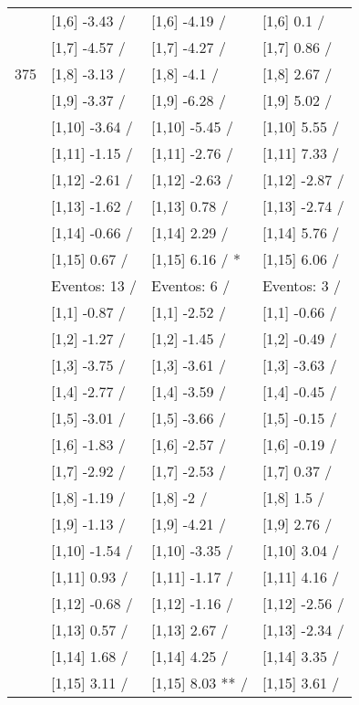 \begin{table}
\begin{tabular}[t]{llll}
 & {}[1,6] -3.43  / & {}[1,6] -4.19  / & {}[1,6] 0.1  /\\
 & {}[1,7] -4.57  / & {}[1,7] -4.27  / & {}[1,7] 0.86  /\\
375 & {}[1,8] -3.13  / & {}[1,8] -4.1  / & {}[1,8] 2.67  /\\
\addlinespace
 & {}[1,9] -3.37  / & {}[1,9] -6.28  / & {}[1,9] 5.02  /\\
 & {}[1,10] -3.64  / & {}[1,10] -5.45  / & {}[1,10] 5.55  /\\
 & {}[1,11] -1.15  / & {}[1,11] -2.76  / & {}[1,11] 7.33  /\\
 & {}[1,12] -2.61  / & {}[1,12] -2.63  / & {}[1,12] -2.87  /\\
 & {}[1,13] -1.62  / & {}[1,13] 0.78  / & {}[1,13] -2.74  /\\
\addlinespace
 & {}[1,14] -0.66  / & {}[1,14] 2.29  / & {}[1,14] 5.76  /\\
 & {}[1,15] 0.67  / & {}[1,15] 6.16  / * & {}[1,15] 6.06  /\\
 & Eventos:  13 / & Eventos:  6 / & Eventos:  3 /\\
 & {}[1,1] -0.87  / & {}[1,1] -2.52  / & {}[1,1] -0.66  /\\
 & {}[1,2] -1.27  / & {}[1,2] -1.45  / & {}[1,2] -0.49  /\\
\addlinespace
 & {}[1,3] -3.75  / & {}[1,3] -3.61  / & {}[1,3] -3.63  /\\
 & {}[1,4] -2.77  / & {}[1,4] -3.59  / & {}[1,4] -0.45  /\\
 & {}[1,5] -3.01  / & {}[1,5] -3.66  / & {}[1,5] -0.15  /\\
 & {}[1,6] -1.83  / & {}[1,6] -2.57  / & {}[1,6] -0.19  /\\
 & {}[1,7] -2.92  / & {}[1,7] -2.53  / & {}[1,7] 0.37  /\\
\addlinespace
500 & {}[1,8] -1.19  / & {}[1,8] -2  / & {}[1,8] 1.5  /\\
 & {}[1,9] -1.13  / & {}[1,9] -4.21  / & {}[1,9] 2.76  /\\
 & {}[1,10] -1.54  / & {}[1,10] -3.35  / & {}[1,10] 3.04  /\\
 & {}[1,11] 0.93  / & {}[1,11] -1.17  / & {}[1,11] 4.16  /\\
 & {}[1,12] -0.68  / & {}[1,12] -1.16  / & {}[1,12] -2.56  /\\
\addlinespace
 & {}[1,13] 0.57  / & {}[1,13] 2.67  / & {}[1,13] -2.34  /\\
 & {}[1,14] 1.68  / & {}[1,14] 4.25  / & {}[1,14] 3.35  /\\
 & {}[1,15] 3.11  / & {}[1,15] 8.03 ** / & {}[1,15] 3.61  /\\
\bottomrule
\end{tabular}
\end{table}
